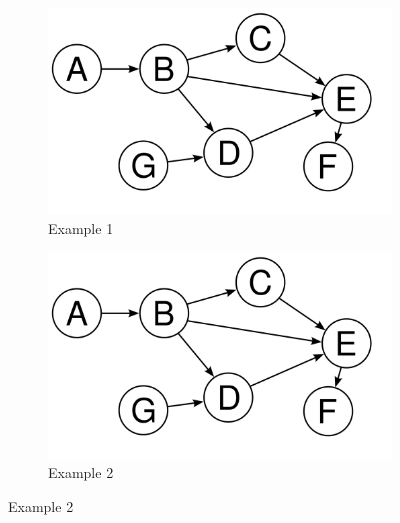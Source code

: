 \begin{figure}[t]
	\centering
	
	\begin{subfigure}{\columnwidth}
		\includegraphics[width=\columnwidth]{../gfx/example.png}
		\caption{Example 1}
		\label{figure:examples_1}
	\end{subfigure}
	\hfill
	\begin{subfigure}{\columnwidth}
		\includegraphics[width=\columnwidth]{../gfx/example.png}
		\caption{Example 2}
		\label{figure:examples_2}
	\end{subfigure}
	

\end{figure}
